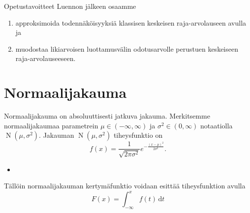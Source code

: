 \documentclass{beamer}
\DeclareMathOperator{\n}{\mathrm N}
\begin{document}

\begin{frame}{Opetustavoitteet}
  Luennon jälkeen osaamme
  \begin{enumerate}
    \item approksimoida todennäköisyyksiä klassisen keskeisen raja-arvolauseen
    avulla ja
    \pause
    \item muodostaa likiarvoisen luottamusvälin odotusarvolle perustuen
    keskeiseen raja-arvolauseeseen.
  \end{enumerate}
\end{frame}


\section{Normaalijakauma}

\begin{frame}
  Normaalijakauma on absoluuttisesti jatkuva jakauma. Merkitsemme
  normaalijakaumaa parametrein $\mu\in(-\infty, \infty)$ ja
  $\sigma^2\in(0,\infty)$ notaatiolla $\n\left(\mu, \sigma^2\right)$. Jakauman
  $\n\left(\mu, \sigma^2\right)$ tiheysfunktio on
  \begin{equation*}
    f(x) = \frac{1}{\sqrt{2\pi\sigma^2}} e^{-\frac{\left(x-\mu\right)^2}
    {2\sigma^2}}.
  \end{equation*}
  \pause
  \begin{itemize}
    \item[]
  \end{itemize}
  Tällöin normaalijakauman kertymäfunktio voidaan esittää tiheysfunktion avulla
  \begin{equation*}
    F\left(x\right) = \int_{-\infty}^{x} f(t)\,\mathrm{d}t
  \end{equation*}
\end{frame}

\end{document}
